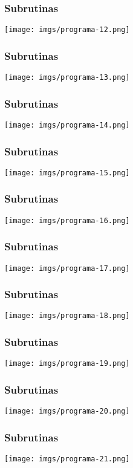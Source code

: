 \documentclass{beamer}
\begin{document}
\begin{frame}
\frametitle{Subrutinas}
\texttt{[image: imgs/programa-12.png]}
\end{frame}

\begin{frame}
\frametitle{Subrutinas}
\texttt{[image: imgs/programa-13.png]}
\end{frame}

\begin{frame}
\frametitle{Subrutinas}
\texttt{[image: imgs/programa-14.png]}
\end{frame}

\begin{frame}
\frametitle{Subrutinas}
\texttt{[image: imgs/programa-15.png]}
\end{frame}

\begin{frame}
\frametitle{Subrutinas}
\texttt{[image: imgs/programa-16.png]}
\end{frame}

\begin{frame}
\frametitle{Subrutinas}
\texttt{[image: imgs/programa-17.png]}
\end{frame}

\begin{frame}
\frametitle{Subrutinas}
\texttt{[image: imgs/programa-18.png]}
\end{frame}

\begin{frame}
\frametitle{Subrutinas}
\texttt{[image: imgs/programa-19.png]}
\end{frame}

\begin{frame}
\frametitle{Subrutinas}
\texttt{[image: imgs/programa-20.png]}
\end{frame}

\begin{frame}
\frametitle{Subrutinas}
\texttt{[image: imgs/programa-21.png]}
\end{frame}
\end{document}
